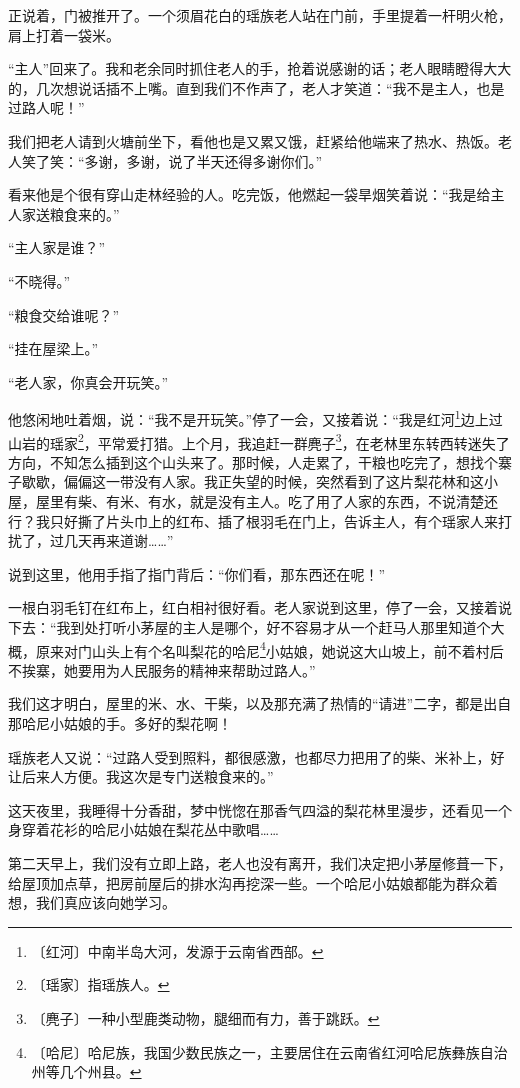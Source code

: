 \documentclass[12pt,UTF-8,openany]{ctexbook}
\begin{document}
\begin{normalsize}
    正说着，门被推开了。一个须眉花白的瑶族老人站在门前，手里提着一杆明火枪，肩上打着一袋米。
    
    “主人”回来了。我和老余同时抓住老人的手，抢着说感谢的话；老人眼睛瞪得大大的，几次想说话插不上嘴。直到我们不作声了，老人才笑道：“我不是主人，也是过路人呢！”
    
    我们把老人请到火塘前坐下，看他也是又累又饿，赶紧给他端来了热水、热饭。老人笑了笑：“多谢，多谢，说了半天还得多谢你们。”
    
    看来他是个很有穿山走林经验的人。吃完饭，他燃起一袋旱烟笑着说：“我是给主人家送粮食来的。”
    
    “主人家是谁？”
    
    “不晓得。”
    
    “粮食交给谁呢？”
    
    “挂在屋梁上。”
    
    “老人家，你真会开玩笑。”
    
    他悠闲地吐着烟，说：“我不是开玩笑。”停了一会，又接着说：“我是红河\footnote{〔红河〕中南半岛大河，发源于云南省西部。}边上过山岩的瑶家\footnote{〔瑶家〕指瑶族人。}，平常爱打猎。上个月，我追赶一群麂子\footnote{〔麂子〕一种小型鹿类动物，腿细而有力，善于跳跃。}，在老林里东转西转迷失了方向，不知怎么插到这个山头来了。那时候，人走累了，干粮也吃完了，想找个寨子歇歇，偏偏这一带没有人家。我正失望的时候，突然看到了这片梨花林和这小屋，屋里有柴、有米、有水，就是没有主人。吃了用了人家的东西，不说清楚还行？我只好撕了片头巾上的红布、插了根羽毛在门上，告诉主人，有个瑶家人来打扰了，过几天再来道谢……”
    
    说到这里，他用手指了指门背后：“你们看，那东西还在呢！”
    
    一根白羽毛钉在红布上，红白相衬很好看。老人家说到这里，停了一会，又接着说下去：“我到处打听小茅屋的主人是哪个，好不容易才从一个赶马人那里知道个大概，原来对门山头上有个名叫梨花的哈尼\footnote{〔哈尼〕哈尼族，我国少数民族之一，主要居住在云南省红河哈尼族彝族自治州等几个州县。}小姑娘，她说这大山坡上，前不着村后不挨寨，她要用为人民服务的精神来帮助过路人。”
    
    我们这才明白，屋里的米、水、干柴，以及那充满了热情的“请进”二字，都是出自那哈尼小姑娘的手。多好的梨花啊！
    
    瑶族老人又说：“过路人受到照料，都很感激，也都尽力把用了的柴、米补上，好让后来人方便。我这次是专门送粮食来的。”
    
    这天夜里，我睡得十分香甜，梦中恍惚在那香气四溢的梨花林里漫步，还看见一个身穿着花衫的哈尼小姑娘在梨花丛中歌唱……
    
    第二天早上，我们没有立即上路，老人也没有离开，我们决定把小茅屋修葺一下，给屋顶加点草，把房前屋后的排水沟再挖深一些。一个哈尼小姑娘都能为群众着想，我们真应该向她学习。
    

\end{normalsize}
\end{document}
